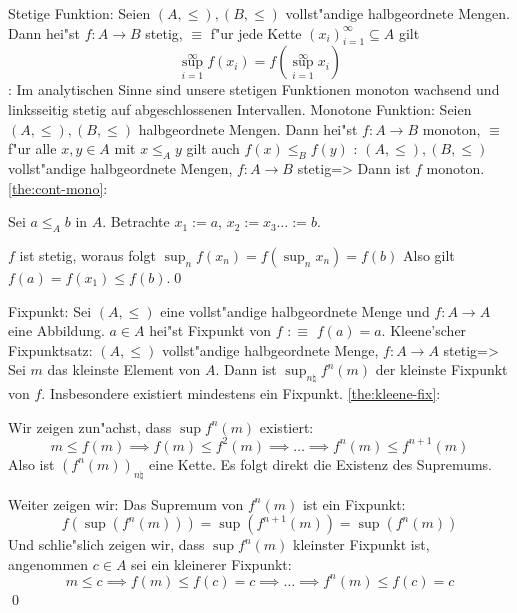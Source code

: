  Stetige Funktion:{
  Seien $(A,\le),(B,\le)$ vollst"andige halbgeordnete Mengen. Dann
  hei"st $f: A \to B$ stetig, $\equiv$ f"ur jede Kette 
  $(x_i)_{i=1}^\infty\subseteq A$ gilt
  \[\sup_{i=1}^\infty f(x_i) = f(\sup_{i=1}^\infty x_i)
    \]
  }
\remark:{
  Im analytischen Sinne sind unsere stetigen Funktionen monoton wachsend
  und linksseitig stetig auf abgeschlossenen Intervallen.
  }
 Monotone Funktion:{
  Seien $(A,\le),(B,\le)$ halbgeordnete Mengen. Dann
  hei"st $f: A \to B$ monoton, $\equiv$ f"ur alle $x,y\in A$ mit
  $x\le_A y$ gilt auch $f(x)\le_B f(y)$
  }
\lemma:
  $(A, \leq),(B,\le)$ vollst"andige halbgeordnete Mengen,
  $f:A\to B$ stetig=>{
  \label{the:cont-mono}
  Dann ist $f$ monoton.
  }
\proof \ref{the:cont-mono}:{
  Sei $a\le_A b$ in $A$. Betrachte $x_1:=a$, $x_2:=x_3\ldots:=b$.
  
  $f$ ist stetig, woraus folgt $\sup_n f(x_n)=f(\sup_n x_n)=f(b)$
  Also gilt $f(a)=f(x_1)\le f(b)$.\qed
  }
 Fixpunkt:{
  Sei $(A,\leq)$ eine vollst"andige halbgeordnete Menge und $f:A\to A$ 
  eine Abbildung. $a \in A$ hei"st Fixpunkt von $f$ $:\equiv$ $f(a)=a$.
  }
\theorem Kleene'scher Fixpunktsatz:
  $(A,\le)$ vollst"andige halbgeordnete Menge, $f:A\to A$ stetig=>{
  \label{the:kleene-fix}
  Sei $m$ das kleinste Element von $A$. Dann ist
  $\sup_{n\natural} f^n(m)$ der kleinste Fixpunkt von $f$. 
  Insbesondere existiert mindestens ein Fixpunkt.
  }
\proof \ref{the:kleene-fix}:{
  Wir zeigen zun"achst, dass $\sup f^n(m)$ existiert:
  \[m\leq f(m)\implies f(m)\leq f^2(m)\implies\ldots\implies f^n(m)\le f^{n+1}(m)
    \]
  Also ist $(f^n(m))_{n\natural}$ eine Kette. Es folgt direkt die
  Existenz des Supremums.
  
  Weiter zeigen wir: Das Supremum von $f^n(m)$ ist ein Fixpunkt:
  \[f(\sup(f^n(m))) = \sup(f^{n + 1}(m)) = \sup(f^n(m))
    \]
  Und schlie"slich zeigen wir, dass $\sup f^n(m)$ kleinster Fixpunkt ist,
  angenommen $c\in A$ sei ein kleinerer Fixpunkt:
  \[m\le c\implies f(m)\le f(c)=c \implies\ldots\implies f^n(m) \le f(c)=c
    \]
  \qed
  }
